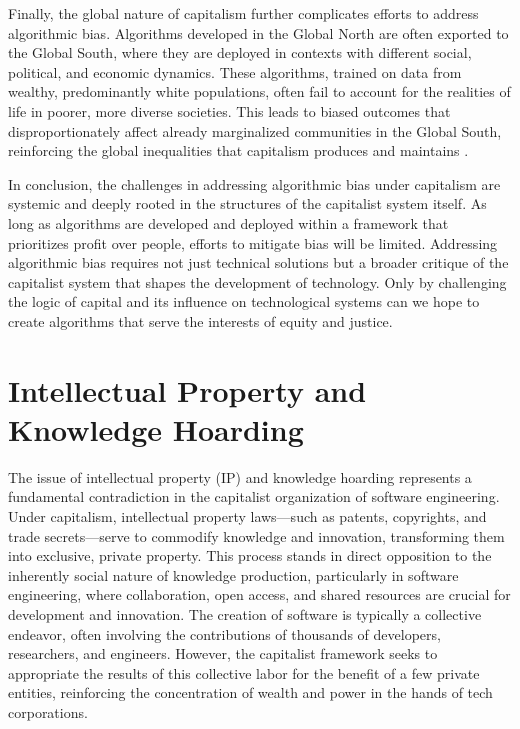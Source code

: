 Finally, the global nature of capitalism further complicates efforts to address algorithmic bias. Algorithms developed in the Global North are often exported to the Global South, where they are deployed in contexts with different social, political, and economic dynamics. These algorithms, trained on data from wealthy, predominantly white populations, often fail to account for the realities of life in poorer, more diverse societies. This leads to biased outcomes that disproportionately affect already marginalized communities in the Global South, reinforcing the global inequalities that capitalism produces and maintains \cite[pp.~28-31]{birhane2021}.

In conclusion, the challenges in addressing algorithmic bias under capitalism are systemic and deeply rooted in the structures of the capitalist system itself. As long as algorithms are developed and deployed within a framework that prioritizes profit over people, efforts to mitigate bias will be limited. Addressing algorithmic bias requires not just technical solutions but a broader critique of the capitalist system that shapes the development of technology. Only by challenging the logic of capital and its influence on technological systems can we hope to create algorithms that serve the interests of equity and justice.

\section{Intellectual Property and Knowledge Hoarding}

The issue of intellectual property (IP) and knowledge hoarding represents a fundamental contradiction in the capitalist organization of software engineering. Under capitalism, intellectual property laws—such as patents, copyrights, and trade secrets—serve to commodify knowledge and innovation, transforming them into exclusive, private property. This process stands in direct opposition to the inherently social nature of knowledge production, particularly in software engineering, where collaboration, open access, and shared resources are crucial for development and innovation. The creation of software is typically a collective endeavor, often involving the contributions of thousands of developers, researchers, and engineers. However, the capitalist framework seeks to appropriate the results of this collective labor for the benefit of a few private entities, reinforcing the concentration of wealth and power in the hands of tech corporations.

